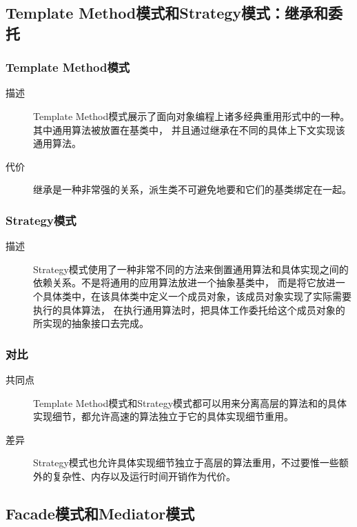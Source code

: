 \documentclass[11pt]{article}
\begin{document}
\subsection{Template Method模式和Strategy模式：继承和委托}
\label{sec:orgb134e05}
\subsubsection{Template Method模式}
\label{sec:orge515801}
\begin{description}
\item[{描述}] Template Method模式展示了面向对象编程上诸多经典重用形式中的一种。其中通用算法被放置在基类中，
并且通过继承在不同的具体上下文实现该通用算法。
\item[{代价}] 继承是一种非常强的关系，派生类不可避免地要和它们的基类绑定在一起。
\end{description}
\subsubsection{Strategy模式}
\label{sec:org706cc45}
\begin{description}
\item[{描述}] Strategy模式使用了一种非常不同的方法来倒置通用算法和具体实现之间的依赖关系。不是将通用的应用算法放进一个抽象基类中，
而是将它放进一个具体类中，在该具体类中定义一个成员对象，该成员对象实现了实际需要执行的具体算法，
在执行通用算法时，把具体工作委托给这个成员对象的所实现的抽象接口去完成。
\end{description}
\subsubsection{对比}
\label{sec:orgaf31274}
\begin{description}
\item[{共同点}] Template Method模式和Strategy模式都可以用来分离高层的算法和的具体实现细节，都允许高速的算法独立于它的具体实现细节重用。
\item[{差异}] Strategy模式也允许具体实现细节独立于高层的算法重用，不过要惟一些额外的复杂性、内存以及运行时间开销作为代价。
\end{description}

\subsection{Facade模式和Mediator模式}
\label{sec:orgfa975e9}
\end{document}
